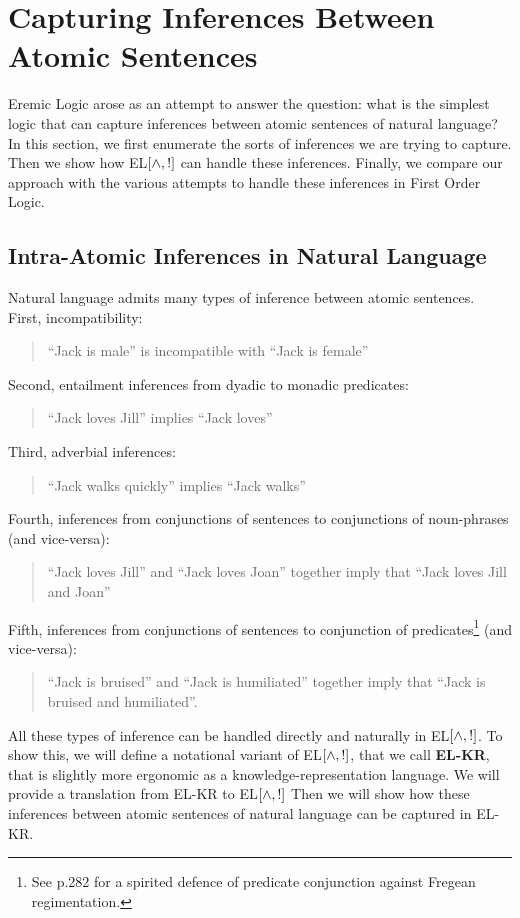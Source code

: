 
\section{Capturing Inferences Between Atomic Sentences}
Eremic Logic arose as an attempt to answer the question: what is the simplest logic that can capture inferences between atomic sentences of natural language? 
In this section, we first enumerate the sorts of inferences we are trying to capture.
Then we show how EL$[\land, !]$ can handle these inferences.
Finally, we compare our approach with the various attempts to handle these inferences in First Order Logic.

\subsection{Intra-Atomic Inferences in Natural Language}
Natural language admits many types of inference between atomic sentences.
First, incompatibility:
\begin{quote}
``Jack is male'' is incompatible with ``Jack is female''
\end{quote}
Second, entailment inferences from dyadic to monadic predicates:
\begin{quote}
``Jack loves Jill'' implies ``Jack loves''
\end{quote}
Third, adverbial inferences:
\begin{quote}
``Jack walks quickly'' implies ``Jack walks''
\end{quote}
Fourth, inferences from conjunctions of sentences to conjunctions of noun-phrases (and vice-versa):
\begin{quote}
``Jack loves Jill'' and ``Jack loves Joan'' together imply that ``Jack loves Jill and Joan''
\end{quote}
Fifth, inferences from conjunctions of sentences to conjunction of predicates\footnote{See \cite{sommers} p.282 for a spirited defence of predicate conjunction against Fregean regimentation.} (and vice-versa):
\begin{quote}
``Jack is bruised'' and ``Jack is humiliated'' together imply that ``Jack is bruised and humiliated''.
\end{quote}

All these types of inference can be handled directly and naturally in EL$[\land, !]$.
To show this, we will define a notational variant of EL$[\land, !]$, that we call {\bf EL-KR}, that is slightly more ergonomic as a knowledge-representation language. We will provide a translation from EL-KR to EL$[\land, !]$
Then we will show how these inferences between atomic sentences of natural language can be captured in EL-KR.

